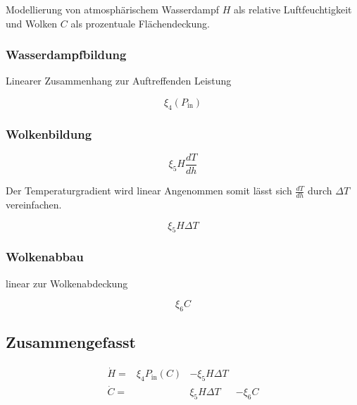 \begin{refsection}
Modellierung von atmosphärischem Wasserdampf $H$ als relative Luftfeuchtigkeit und Wolken $C$ als prozentuale Flächendeckung.


\subsubsection{Wasserdampfbildung}

Linearer Zusammenhang zur Auftreffenden Leistung

\begin{equation}
\xi_4 (P_{\text{in}})
\end{equation}

\subsubsection{Wolkenbildung}

\begin{equation}
\xi_5 H \frac{dT}{dh}
\end{equation}

Der Temperaturgradient wird linear Angenommen somit lässt sich $\frac{dT}{dh}$ durch $\Delta T $ vereinfachen. 

\begin{equation}
\xi_5 H \Delta T
\end{equation}

\subsubsection{Wolkenabbau}

linear zur Wolkenabdeckung

\begin{equation}
\xi_6 C
\end{equation}

\subsection{Zusammengefasst}

\begin{equation}
	\begin{matrix}			
		\dot{H} = & \xi_4 P_{\text{in}}(C) & - \xi_5 H \Delta T & \\
		\dot{C} = &                       &   \xi_5 H \Delta T & - \xi_6 C
	\end{matrix}	
\end{equation}



\end{refsection}
